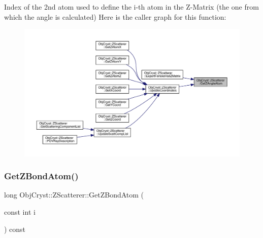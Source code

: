 Index of the 2nd atom used to define the i-\/th atom in the Z-\/\+Matrix (the one from which the angle is calculated) Here is the caller graph for this function\+:
\nopagebreak
\begin{figure}[H]
\begin{center}
\leavevmode
\includegraphics[width=350pt]{class_obj_cryst_1_1_z_scatterer_af6ffcf6d863d090c6e72c2749f6c7768_icgraph}
\end{center}
\end{figure}
\mbox{\label{class_obj_cryst_1_1_z_scatterer_a43c9a89c1b3523e0f321bb587342a9af}} 
\subsubsection{\texorpdfstring{GetZBondAtom()}{GetZBondAtom()}}
{\footnotesize\ttfamily long Obj\+Cryst\+::\+Z\+Scatterer\+::\+Get\+Z\+Bond\+Atom (\begin{DoxyParamCaption}\item[{const int}]{i }\end{DoxyParamCaption}) const}

